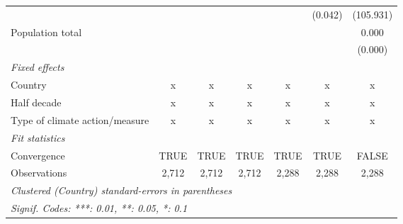 \begin{tabular}{lcccccc}
                                                       &               &              &               &               & (0.042)       & (105.931)\\   
   Population total                                    &               &              &               &               &               & 0.000\\   
                                                       &               &              &               &               &               & (0.000)\\   
   \emph{Fixed effects}\\
   Country                                             & x             & x            & x             & x             & x             & x\\  
   Half decade                                         & x             & x            & x             & x             & x             & x\\  
   Type of climate action/measure                      & x             & x            & x             & x             & x             & x\\  
   \midrule \emph{Fit statistics}\\
   Convergence                                         &TRUE           & TRUE         & TRUE          & TRUE          & TRUE          & FALSE\\  
   Observations                                        & 2,712         & 2,712        & 2,712         & 2,288         & 2,288         & 2,288\\  
   \midrule
   \multicolumn{7}{l}{\emph{Clustered (Country) standard-errors in parentheses}}\\
   \multicolumn{7}{l}{\emph{Signif. Codes: ***: 0.01, **: 0.05, *: 0.1}}\\
\end{tabular}
\par\endgroup


